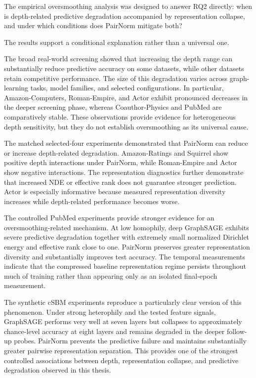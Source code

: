 \documentclass[english]{lni}
\begin{document}
The empirical oversmoothing analysis was designed to answer RQ2 directly: when is depth-related predictive degradation accompanied by representation collapse, and under which conditions does PairNorm mitigate both?

The results support a conditional explanation rather than a universal one.

The broad real-world screening showed that increasing the depth range can substantially reduce predictive accuracy on some datasets, while other datasets retain competitive performance. The size of this degradation varies across graph-learning tasks, model families, and selected configurations. In particular, Amazon-Computers, Roman-Empire, and Actor exhibit pronounced decreases in the deeper screening phase, whereas Coauthor-Physics and PubMed are comparatively stable. These observations provide evidence for heterogeneous depth sensitivity, but they do not establish oversmoothing as its universal cause.

The matched selected-four experiments demonstrated that PairNorm can reduce or increase depth-related degradation. Amazon-Ratings and Squirrel show positive depth interactions under PairNorm, while Roman-Empire and Actor show negative interactions. The representation diagnostics further demonstrate that increased NDE or effective rank does not guarantee stronger prediction. Actor is especially informative because measured representation diversity increases while depth-related performance becomes worse.

The controlled PubMed experiments provide stronger evidence for an oversmoothing-related mechanism. At low homophily, deep GraphSAGE exhibits severe predictive degradation together with extremely small normalized Dirichlet energy and effective rank close to one. PairNorm preserves greater representation diversity and substantially improves test accuracy. The temporal measurements indicate that the compressed baseline representation regime persists throughout much of training rather than appearing only as an isolated final-epoch measurement.

The synthetic cSBM experiments reproduce a particularly clear version of this phenomenon. Under strong heterophily and the tested feature signals, GraphSAGE performs very well at seven layers but collapses to approximately chance-level accuracy at eight layers and remains degraded in the deeper follow-up probes. PairNorm prevents the predictive failure and maintains substantially greater pairwise representation separation. This provides one of the strongest controlled associations between depth, representation collapse, and predictive degradation observed in this thesis.
\end{document}
